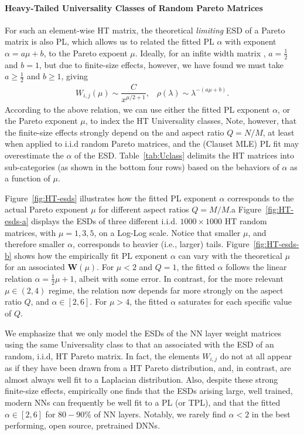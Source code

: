 \paragraph{Heavy-Tailed Universality Classes of Random Pareto Matrices}
For such an element-wise HT matrix, the theoretical \emph{limiting} ESD of a Pareto matrix is also PL,
which allows us to related the fitted PL $\alpha$ with exponent $\alpha=a\mu+b$, to the Pareto expoent $\mu$.
Ideally, for an infite width matrix ,  $a=\tfrac{1}{2}$ and $b=1$, but due to finite-size effects, however,
we have found we must take $a\ge \tfrac{1}{2}$ and $b\ge 1$, giving
\begin{align}
W_{i,j}(\mu)\sim\dfrac{C}{x^{\mu/2 +1}},\;\;\;\rho(\lambda)\sim\lambda^{-(a\mu+b)}.
\end{align}
According to the above relation, 
we can use either the fitted PL exponent $\alpha$, or the Pareto exponent $\mu$,
to index the HT Universality classes,
Note, however, that the finite-size effects strongly depend on  the and aspect ratio  $Q=N/M$,
at least when applied to i.i.d random Pareto matrices, and 
the (Clauset MLE) PL fit may overestimate the $\alpha$ of the ESD.
Table~\ref{tab:Uclass} delimits the HT matrices 
into sub-categories (as shown in the bottom four rows)  based on the behaviors of $\alpha$ as a function of $\mu$.

Figure~\ref{fig:HT-esds} illustrates how the fitted PL exponent $\alpha$ corresponds to the actual Pareto exponent $\mu$ 
for different aspect ratios $Q=M/M$.a
Figure~\ref{fig:HT-esds-a} displays the ESDs of three different i.i.d. $1000\times1000$ HT random matrices, with $\mu=1,3,5$, on a Log-Log scale.  
Notice that smaller $\mu$, and therefore smaller $\alpha$, corresponds to heavier (i.e., larger) tails.
Figure~\ref{fig:HT-esds-b} shows how the empirically fit PL exponent $\alpha$ can vary with the theoretical $\mu$ for an associated $\mathbf{W}(\mu)$.
For $\mu<2$ and $Q=1$, the fitted $\alpha$ follows the linear relation $\alpha=\frac{1}{2}\mu+1$,
albeit with some error.
In contrast, for the more relevant $\mu \in (2,4)$ regime, the relation now depends far more 
strongly on the aspect ratio $Q$, and $\alpha\in[2,6]$.
For $\mu>4$, the fitted $\alpha$ saturates for each specific value of $Q$.

We emphasize that we only model the ESDs of the NN layer weight matrices using the
same Universality class to that an associated with the ESD of an random, i.i.d, HT Pareto matrix.
In fact, the elements $W_{i,j}$ do not at all appear as if they have been
drawn from a HT Pareto distribution, and, in contrast, are almost always well fit to a Laplacian distribution.
Also, despite these strong finite-size effects, empirically one finds that the ESDs arising large, well trained,
modern NNs can frequently be well fit  to a PL (or TPL), and that the fitted $\alpha\in [2,6]$ for $80-90\%$
of NN layers.  Notably, we rarely find $\alpha<2$ in the best performing, open source, pretrained DNNs.

